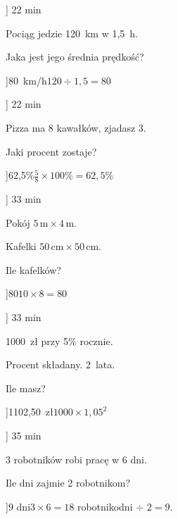 
\ExerciseSlide[\CategoryBadge[MixColor!20]{Pr\k{e}dko\'s\'c}]
  {2}{2 min}{%
    Poci\k{a}g jedzie 120~km w 1{,}5~h.\par
    Jaka jest jego \'{s}rednia pr\k{e}dko\'s\'c?
  }
\AnswerSlide[\CategoryBadge[MixColor!20]{Pr\k{e}dko\'s\'c}]{80~km/h}{$120 \div 1{,}5 = 80$}

\ExerciseSlide[\CategoryBadge[MixColor!20]{Procenty}]
  {2}{2 min}{%
    Pizza ma 8 kawa\l{}k\'{o}w, zjadasz 3.\par
    Jaki procent zostaje?
  }
\AnswerSlide[\CategoryBadge[MixColor!20]{Procenty}]{62{,}5\%}{$\tfrac{5}{8} \times 100\% = 62{,}5\%$}

\ExerciseSlide[\CategoryBadge[MixColor!20]{Geometria}]
  {3}{3 min}{%
    Pok\'{o}j $5\,\text{m}\times 4\,\text{m}$.\par
    Kafelki $50\,\text{cm}\times 50\,\text{cm}$.\par
    Ile kafelk\'{o}w?
  }
\AnswerSlide[\CategoryBadge[MixColor!20]{Geometria}]{80}{$10 \times 8 = 80$}

\ExerciseSlide[\CategoryBadge[MixColor!20]{Finanse}]
  {3}{3 min}{%
    1000~z\l{} przy 5\% rocznie.\par
    Procent sk\l{}adany. 2~lata.\par
    Ile masz?
  }
\AnswerSlide[\CategoryBadge[MixColor!20]{Finanse}]{1102{,}50~z\l{}}{$1000 \times 1{,}05^2$}

\ExerciseSlide[\CategoryBadge[MixColor!20]{Praca}]
  {3}{5 min}{%
    3 robotnik\'{o}w robi prac\k{e} w 6 dni.\par
    Ile dni zajmie 2 robotnikom?
  }
\AnswerSlide[\CategoryBadge[MixColor!20]{Praca}]{9 dni}{$3 \times 6 = 18$ robotnikodni $\div$ $2 = 9$.}
